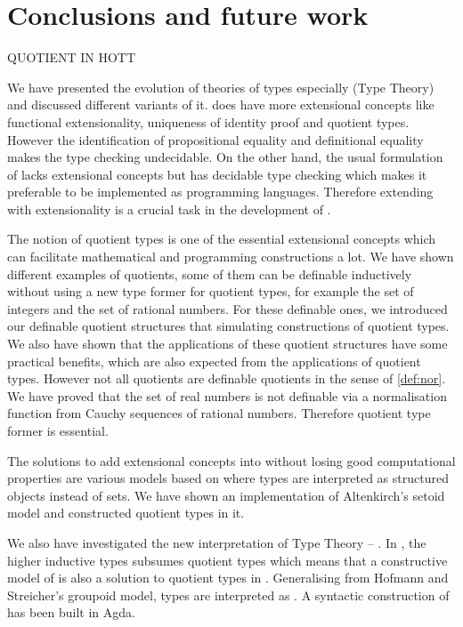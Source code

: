 \chapter{Conclusions and future work}


QUOTIENT IN HOTT



We have presented the evolution of theories of types especially \mltt (Type Theory) and discussed different variants of it. \ett does have more extensional concepts like functional extensionality, uniqueness of identity proof and quotient types. However the identification of propositional equality and definitional equality makes the type checking undecidable. On the other hand, the usual formulation of \itt lacks extensional concepts but has decidable type checking which makes it preferable to be implemented as programming languages. Therefore extending \itt with extensionality is a crucial task in the development of \mltt.

The notion of quotient types is one of the essential extensional concepts which can facilitate mathematical and programming constructions a lot. We have shown different examples of quotients, some of them can be definable inductively without using a new type former for quotient types, for example the set of integers and the set of rational numbers. For these definable ones, we introduced our definable quotient structures that simulating constructions of quotient types. We also have shown that the applications of these quotient structures have some practical benefits, which are also expected from 
the applications of quotient types.
However not all quotients are definable quotients in the sense of \autoref{def:nor}. We have proved that the set of real numbers is not definable via a normalisation function from Cauchy sequences of rational numbers. Therefore quotient type former is essential.

The solutions to add extensional concepts into \itt without losing good computational properties are various models based on \itt where types are interpreted as structured objects instead of sets. We have shown an implementation of Altenkirch's setoid model and constructed quotient types in it.

We also have investigated the new interpretation of Type Theory -- \hott. In \hott, the higher inductive types subsumes quotient types which means that a constructive model of \hott is also a solution to quotient types in \itt.
Generalising from Hofmann and Streicher's groupoid model, types are interpreted as \wog. A syntactic construction of \wog has been built in Agda. 


